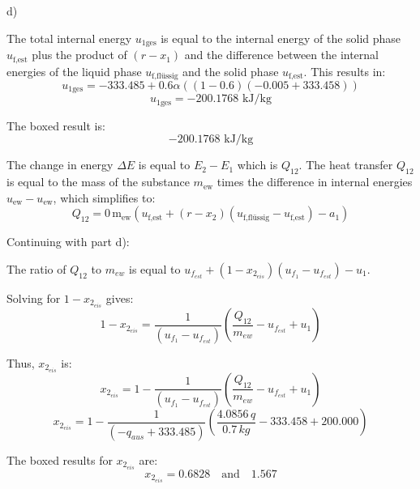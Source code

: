 d)

The total internal energy \( u_{1\text{ges}} \) is equal to the internal energy of the solid phase \( u_{\text{f,est}} \) plus the product of \( (r-x_1) \) and the difference between the internal energies of the liquid phase \( u_{\text{f,flüssig}} \) and the solid phase \( u_{\text{f,est}} \). This results in:
\[ u_{1\text{ges}} = -333.485 + 0.6 \alpha \left( (1-0.6) (-0.005 + 333.458) \right) \]
\[ u_{1\text{ges}} = -200.1768 \text{ kJ/kg} \]

The boxed result is:
\[ -200.1768 \text{ kJ/kg} \]

The change in energy \( \Delta E \) is equal to \( E_2 - E_1 \) which is \( Q_{12} \). The heat transfer \( Q_{12} \) is equal to the mass of the substance \( m_{\text{ew}} \) times the difference in internal energies \( u_{\text{ew}} - u_{\text{ew}} \), which simplifies to:
\[ Q_{12} = 0 \, \text{m}_{\text{ew}} \left( u_{\text{f,est}} + (r-x_2) (u_{\text{f,flüssig}} - u_{\text{f,est}}) - a_1 \right) \]

Continuing with part d):

The ratio of \( Q_{12} \) to \( m_{ew} \) is equal to \( u_{f_{est}} + (1 - x_{2_{eis}})(u_{f_1} - u_{f_{est}}) - u_1 \).

Solving for \( 1 - x_{2_{eis}} \) gives:
\[ 1 - x_{2_{eis}} = \frac{1}{(u_{f_1} - u_{f_{est}})} \left( \frac{Q_{12}}{m_{ew}} - u_{f_{est}} + u_1 \right) \]

Thus, \( x_{2_{eis}} \) is:
\[ x_{2_{eis}} = 1 - \frac{1}{(u_{f_1} - u_{f_{est}})} \left( \frac{Q_{12}}{m_{ew}} - u_{f_{est}} + u_1 \right) \]
\[ x_{2_{eis}} = 1 - \frac{1}{(-q_{aus} + 333.485)} \left( \frac{4.0856 \, q}{0.7 \, kg} - 333.458 + 200.000 \right) \]

The boxed results for \( x_{2_{eis}} \) are:
\[ x_{2_{eis}} = 0.6828 \quad \text{and} \quad 1.567 \]